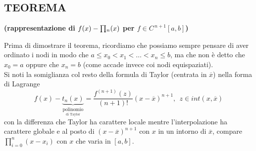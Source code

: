 \subsection{TEOREMA}
\textbf{(rappresentazione di $f(x) - \begin{matrix}\prod\end{matrix}_n(x)$ per $f \in C^{\,n+1}[a,b]$)}
\begin{center}
\end{center}
Prima di dimostrare il teorema, ricordiamo che possiamo sempre pensare di aver ordinato i nodi in modo che $a \leq x_0 < x_1 < \dotso < x_n \leq b$, ma che non è detto che $x_0 = a$ oppure che $x_n = b$ (come accade invece coi nodi equispaziati).\\
Si noti la somiglianza col resto della formula di Taylor (centrata in $\overline{x}$) nella forma di Lagrange
\[ f(x) - \underbrace{t_n(x)}_{\underset{\text{di Taylor}}{\text{polinomio}}} = \frac{f^{(n+1)}(z)}{(n+1)!} (x - \overline{x})^{n+1}, \ \ z \in int(x, \overline{x}) \]
con la differenza che Taylor ha carattere locale mentre l'interpolazione ha carattere globale e al posto di $(x-\overline{x})^{n+1}$ con $x$ in un intorno di $\overline{x}$, compare $\prod_{i=0}^{n} (x-x_i)$ con $x$ che varia in $[a,b]$.\\
\\
